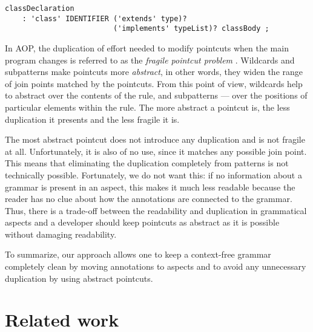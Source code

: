 \documentclass[10pt]{llncs}
\newcommand{\bad}[1]{\textcolor{red}{#1}}
\renewcommand{\bad}[1]{#1}
\begin{document}
\begin{lstlisting}[language=Grammatic,caption=Class declaration rule in Java 1.4,label=java_14,float]
classDeclaration
	: 'class' IDENTIFIER ('extends' type)? 
                         ('implements' typeList)? classBody ;
\end{lstlisting}

In AOP, the duplication of effort needed to modify pointcuts when the main program changes is referred to as the \emph{fragile pointcut problem} \cite{Fragile}. Wildcards and subpatterns make pointcuts more \emph{abstract}, in other words, they widen the range of join points matched by the pointcuts. From this point of view, wildcards help to abstract over the contents of the rule, and subpatterns --- over the positions of particular elements within the rule. The more abstract a pointcut is, the less duplication it presents and the less fragile it is. 

The most abstract pointcut does not introduce any duplication and is not fragile at all. Unfortunately, it is also of no use, since it matches any possible join point. This means that eliminating the duplication completely from patterns is not technically possible. Fortunately, we do not want this: if no information about a grammar is present in an aspect, this makes it much less readable because the reader has no clue about how the annotations are connected to the grammar. Thus, there is a trade-off between the readability and duplication in grammatical aspects and a developer should keep pointcuts as abstract as it is possible without \bad{damaging} readability.

To summarize, our approach allows one to keep a context-free grammar completely clean by moving annotations to aspects and to avoid any unnecessary duplication by using abstract pointcuts. 

\section{Related work}\label{Related}
\end{document}

